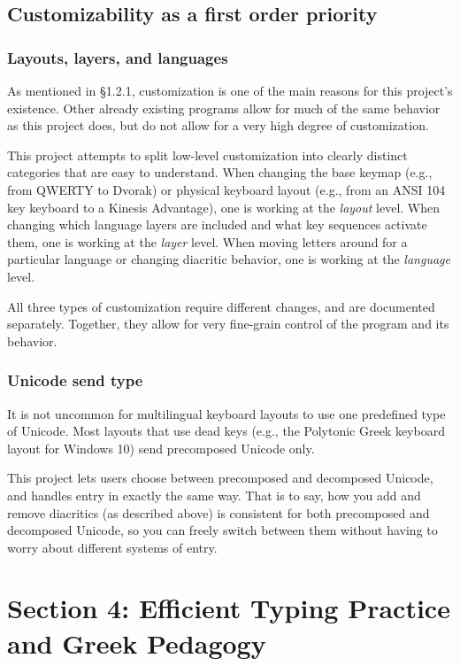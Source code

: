 \documentclass[11pt]{article}
\begin{document}
\subsection{Customizability as a first order priority}
\label{sec:org7938a40}

\subsubsection{Layouts, layers, and languages}
\label{sec:org065f57a}

As mentioned in §1.2.1, customization is one of the main reasons for this project's existence. Other already existing programs allow for much of the same behavior as this project does, but do not allow for a very high degree of customization.

This project attempts to split low-level customization into clearly distinct categories that are easy to understand. When changing the base keymap (e.g., from QWERTY to Dvorak) or physical keyboard layout (e.g., from an ANSI 104 key keyboard to a Kinesis Advantage), one is working at the \emph{layout} level. When changing which language layers are included and what key sequences activate them, one is working at the \emph{layer} level. When moving letters around for a particular language or changing diacritic behavior, one is working at the \emph{language} level.

All three types of customization require different changes, and are documented separately. Together, they allow for very fine-grain control of the program and its behavior.

\subsubsection{Unicode send type}
\label{sec:org248e709}

It is not uncommon for multilingual keyboard layouts to use one predefined type of Unicode. Most layouts that use dead keys (e.g., the Polytonic Greek keyboard layout for Windows 10) send precomposed Unicode only.

This project lets users choose between precomposed and decomposed Unicode, and handles entry in exactly the same way. That is to say, how you add and remove diacritics (as described above) is consistent for both precomposed and decomposed Unicode, so you can freely switch between them without having to worry about different systems of entry.

\section{Section 4: Efficient Typing Practice and Greek Pedagogy}
\label{sec:org623b7e0}
\end{document}
